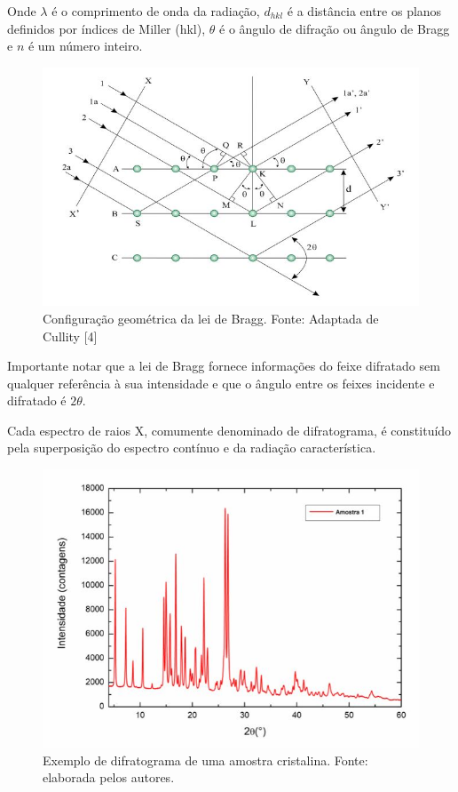 \documentclass[article,12pt,openright,oneside,a4paper,brazil]{abntex2}
\begin{document}
Onde $\lambda$ é o comprimento de onda da radiação, $d_{hkl}$ é a distância entre os planos definidos por índices de Miller (hkl), $\theta$ é o ângulo de difração ou ângulo de Bragg e $n$ é um número inteiro.
\begin{figure}[H]
    \centering
    \includegraphics[scale=0.7]{Figuras/leidebragg.jpg}
    \caption{Configuração geométrica da lei de Bragg. Fonte: Adaptada de Cullity [4]}
    \label{fig:ex}
\end{figure}
Importante notar que a lei de Bragg fornece informações do feixe difratado sem qualquer referência à sua intensidade e que o ângulo entre os feixes incidente e difratado é $2\theta$.

Cada espectro de raios X, comumente denominado de difratograma, é constituído pela superposição do espectro contínuo e da radiação característica.
\begin{figure}[H]
    \centering
    \includegraphics[scale=0.7]{Figuras/ex.jpg}
    \caption{Exemplo de difratograma de uma amostra cristalina. Fonte: elaborada pelos autores.}
    \label{fig:ex}
\end{figure}
\end{document}
